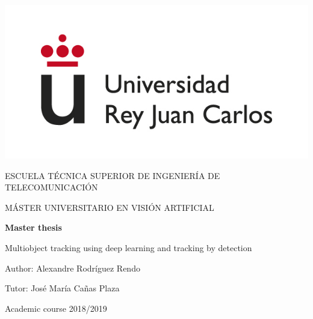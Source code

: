 \begin{titlepage}
	
	\begin{center}
		\vspace*{7.7mm}
		\begin{center}
			\includegraphics[width=0.4\linewidth]{figures/logo.jpg}
		\end{center}
		\vspace{6.5mm}
		
		\fontsize{15.5}{14}\selectfont ESCUELA TÉCNICA SUPERIOR DE INGENIERÍA DE TELECOMUNICACIÓN
		\vspace{13mm}
		
		\fontsize{14}{14}\selectfont MÁSTER UNIVERSITARIO EN VISIÓN ARTIFICIAL 
		
		\vspace{70pt}
		
		\fontsize{15.7}{14}\selectfont \textbf{Master thesis} 
		
		\vspace{25mm}
		\begin{huge}
			Multiobject tracking using deep learning and tracking by detection
		\end{huge}
		
		\vspace{25mm}
		
		\begin{large}
			Author: Alexandre Rodríguez Rendo
			
			Tutor: José María Cañas Plaza
						
			\vspace{10mm}
		\end{large}
		\begin{normalsize}
			Academic course 2018/2019		
		\end{normalsize}
		\vspace{10mm}
		
	\end{center}
	
\end{titlepage}

\pagebreak
\thispagestyle{empty}
\vspace*{12cm}

